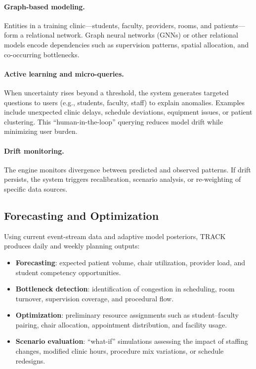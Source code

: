 \documentclass[Afour,sageh,times]{sagej}
\begin{document}
\paragraph{Graph-based modeling.}
Entities in a training clinic—students, faculty, providers, rooms, and patients—form a relational network. Graph neural networks (GNNs) or other relational models encode dependencies such as supervision patterns, spatial allocation, and co-occurring bottlenecks.

\paragraph{Active learning and micro-queries.}
When uncertainty rises beyond a threshold, the system generates targeted questions to users (e.g., students, faculty, staff) to explain anomalies. Examples include unexpected clinic delays, schedule deviations, equipment issues, or patient clustering. This “human-in-the-loop” querying reduces model drift while minimizing user burden.

\paragraph{Drift monitoring.}
The engine monitors divergence between predicted and observed patterns. If drift persists, the system triggers recalibration, scenario analysis, or re-weighting of specific data sources.

\subsection{Forecasting and Optimization}

Using current event-stream data and adaptive model posteriors, TRACK produces daily and weekly planning outputs:

\begin{itemize}[leftmargin=*,itemsep=2pt]
    \item \textbf{Forecasting}: expected patient volume, chair utilization, provider load, and student competency opportunities.
    \item \textbf{Bottleneck detection}: identification of congestion in scheduling, room turnover, supervision coverage, and procedural flow.
    \item \textbf{Optimization}: preliminary resource assignments such as student–faculty pairing, chair allocation, appointment distribution, and facility usage.
    \item \textbf{Scenario evaluation}: “what-if” simulations assessing the impact of staffing changes, modified clinic hours, procedure mix variations, or schedule redesigns.
\end{itemize}
\end{document}
